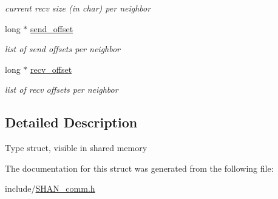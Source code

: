 \begin{DoxyCompactItemize}
\begin{DoxyCompactList}\small\item\em current recv size (in char) per neighbor \end{DoxyCompactList}\item 
long $\ast$ \hyperlink{structtype__local__t_add659698b11598e9b0a36ccd78d01366}{send\+\_\+offset}\hypertarget{structtype__local__t_add659698b11598e9b0a36ccd78d01366}{}\label{structtype__local__t_add659698b11598e9b0a36ccd78d01366}

\begin{DoxyCompactList}\small\item\em list of send offsets per neighbor \end{DoxyCompactList}\item 
long $\ast$ \hyperlink{structtype__local__t_a0b6b2511ba9518d3adfe01807203a6ac}{recv\+\_\+offset}\hypertarget{structtype__local__t_a0b6b2511ba9518d3adfe01807203a6ac}{}\label{structtype__local__t_a0b6b2511ba9518d3adfe01807203a6ac}

\begin{DoxyCompactList}\small\item\em list of recv offsets per neighbor \end{DoxyCompactList}\end{DoxyCompactItemize}


\subsection{Detailed Description}
Type struct, visible in shared memory 

The documentation for this struct was generated from the following file\+:\begin{DoxyCompactItemize}
\item 
include/\hyperlink{SHAN__comm_8h}{S\+H\+A\+N\+\_\+comm.\+h}\end{DoxyCompactItemize}
